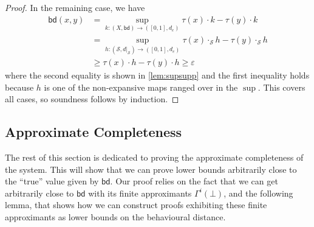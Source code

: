 \documentclass[a4paper,UKenglish,cleveref,autoref,thm-restate]{lipics-v2021}
\newenvironment{proofappendix}[1]{\begin{proof}}{\end{proof}}
\newcommand{\bd}{\mathsf{bd}}
\newcommand{\supps}{\mathcal{S}}
\begin{document}
\begin{proofappendix}{sound}
	In the remaining case, we have
	\begin{align*}
		\bd(x,y) & = \sup_{k \colon (X,\bd) \to ([0,1],d_e)} \tau(x) \cdot k - \tau(y) \cdot k                          \\
		         & = \sup_{h \colon (\supps,d|_\supps) \to ([0,1],d_e)} \tau(x) \cdot_\supps h - \tau(y) \cdot_\supps h \\
		         & \geq \tau(x) \cdot h - \tau(y) \cdot h \geq \varepsilon
	\end{align*}
	where the second equality is shown in \cref{lem:supsupp} and the first inequality holds because \(h\) is one of the non-expansive maps ranged over in the \(\sup\).
	This covers all cases, so soundness follows by induction.
\end{proofappendix}

\subsection{Approximate Completeness}\label{sec:appcomp}
The rest of this section is dedicated to proving the approximate completeness of the system.
This will show that we can prove lower bounds arbitrarily close to the ``true'' value given by \(\bd\).
Our proof relies on the fact that we can get arbitrarily close to \(\bd\) with its finite approximants \(\Gamma^i(\bot)\), and the following lemma, that shows how we can construct proofs exhibiting these finite approximants as lower bounds on the behavioural distance.
\end{document}
